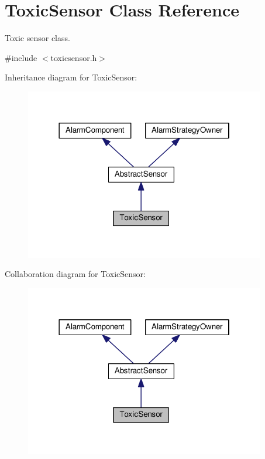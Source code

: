 \hypertarget{classToxicSensor}{}\section{Toxic\+Sensor Class Reference}
\label{classToxicSensor}


Toxic sensor class.  




{\ttfamily \#include $<$toxicsensor.\+h$>$}



Inheritance diagram for Toxic\+Sensor\+:\nopagebreak
\begin{figure}[H]
\begin{center}
\leavevmode
\includegraphics[width=298pt]{classToxicSensor__inherit__graph}
\end{center}
\end{figure}


Collaboration diagram for Toxic\+Sensor\+:\nopagebreak
\begin{figure}[H]
\begin{center}
\leavevmode
\includegraphics[width=298pt]{classToxicSensor__coll__graph}
\end{center}
\end{figure}
